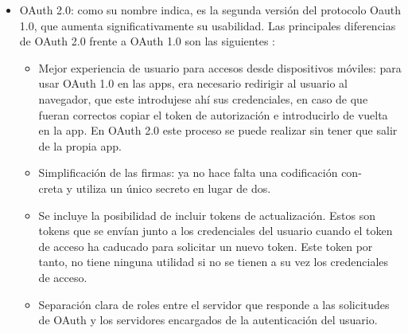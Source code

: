 \begin{itemize}
\item OAuth 2.0: como su nombre indica, es la segunda versión del protocolo Oauth 1.0, que aumenta significativamente su usabilidad. Las principales diferencias de OAuth 2.0 frente a OAuth 1.0 son las siguientes \citep{oauth2}:
\begin{itemize}
\item Mejor experiencia de usuario para accesos desde dispositivos móviles: para usar OAuth 1.0 en las apps, era necesario redirigir al usuario al navegador, que este introdujese ahí sus credenciales, en caso de que fueran correctos copiar el token de autorización e introducirlo de vuelta en la app. En OAuth 2.0 este proceso se puede realizar sin tener que salir de la propia app.
\item Simplificación de las firmas: ya no hace falta una codificación con-\\ creta y utiliza un único secreto en lugar de dos.
\item Se incluye la posibilidad de incluir tokens de actualización. Estos son tokens que se envían junto a los credenciales del usuario cuando el token de acceso ha caducado para solicitar un nuevo token. Este token por tanto, no tiene ninguna utilidad si no se tienen a su vez los credenciales de acceso.
\item Separación clara de roles entre el servidor que responde a las solicitudes de OAuth y los servidores encargados de la autenticación del usuario.
\end{itemize}


\end{itemize}
